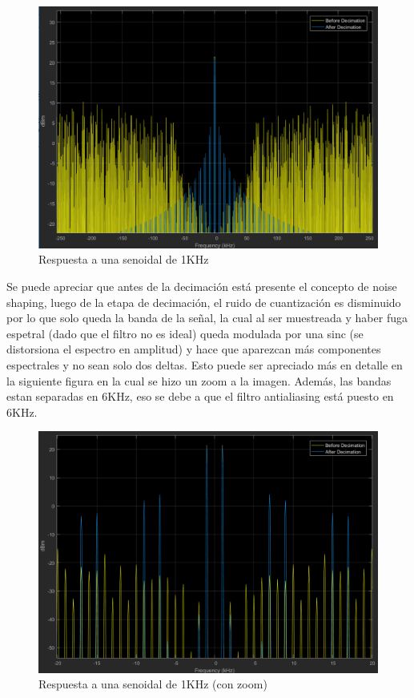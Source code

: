 \documentclass[assd_tp3_main.tex]{subfiles}
\begin{document}
\begin{figure}[H]
\centering
\includegraphics[width=1\linewidth]{images/ej4/sin_response_1K.png}
\caption{Respuesta a una senoidal de 1KHz}
\label{fig:sin_response_1K}
\end{figure}
Se puede apreciar que antes de la decimación está presente el concepto de noise shaping, luego de la etapa de decimación, el ruido de cuantización es disminuido por lo que solo queda la banda de la señal, la cual al ser muestreada y haber fuga espetral (dado que el filtro no es ideal) queda modulada por una sinc (se distorsiona el espectro en amplitud) y hace que aparezcan más componentes espectrales y no sean solo dos deltas. Esto puede ser apreciado más en detalle en la siguiente figura en la cual se hizo un zoom a la imagen. Además, las bandas estan separadas en 6KHz, eso se debe a que el filtro antialiasing está puesto en 6KHz.
\begin{figure}[H]
\centering
\includegraphics[width=1\linewidth]{images/ej4/sin_response_1K_zoom.png}
\caption{Respuesta a una senoidal de 1KHz (con zoom)}
\label{fig:sin_response_1K_zoom}
\end{figure}
\end{document}
